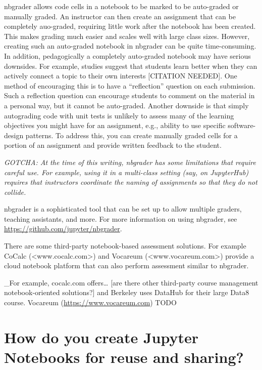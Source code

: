 \documentclass[]{book}
\begin{document}
nbgrader allows code cells in a notebook to be marked to be auto-graded
or manually graded. An instructor can then create an assignment that can
be completely auo-graded, requiring little work after the notebook has
been created. This makes grading much easier and scales well with large
class sizes. However, creating such an auto-graded notebook in nbgrader
can be quite time-consuming. In addition, pedagogically a completely
auto-graded notebook may have serious downsides. For example, studies
suggest that students learn better when they can actively connect a
topic to their own interests {[}CITATION NEEDED{]}. One method of
encouraging this is to have a ``reflection'' question on each
submission. Such a reflection question can encourage students to comment
on the material in a personal way, but it cannot be auto-graded. Another
downside is that simply autograding code with unit tests is unlikely to
assess many of the learning objectives you might have for an assignment,
e.g., ability to use specific software-design patterns. To address this,
you can create manually graded cells for a portion of an assignment and
provide written feedback to the student.

\emph{GOTCHA: At the time of this writing, nbgrader has some limitations
that require careful use. For example, using it in a multi-class setting
(say, on JupyterHub) requires that instructors coordinate the naming of
assignments so that they do not collide.}

nbgrader is a sophisticated tool that can be set up to allow multiple
graders, teaching assistants, and more. For more information on using
nbgrader, see \url{https://github.com/jupyter/nbgrader}.

There are some third-party notebook-based assessment solutions. For
example CoCalc (\textless{}www.cocalc.com\textgreater{}) and Vocareum
(\textless{}www.vocareum.com\textgreater{}) provide a cloud notebook
platform that can also perform assessment similar to nbgrader.

\_For example, cocalc.com offers\ldots{} {[}are there other third-party
course management notebook-oriented solutions?{]} and Berkeley uses
DataHub for their large Data8 course. Vocareum
(\url{https://www.vocareum.com}) TODO

\section{How do you create Jupyter Notebooks for reuse and
sharing?}\label{how-do-you-create-jupyter-notebooks-for-reuse-and-sharing}
\end{document}
